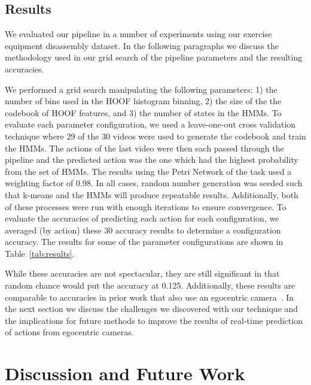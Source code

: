 \documentclass[10pt,twocolumn,letterpaper]{article}
\begin{document}
\subsection{Results}

We evaluated our pipeline in a number of experiments using our exercise equipment disassembly dataset. In the following paragraphs we discuss the methodology used in our grid search of the pipeline parameters and the resulting accuracies.

We performed a grid search manipulating the following parameters: 1) the number of bins used in the HOOF histogram binning, 2) the size of the the codebook of HOOF features, and 3) the number of states in the HMMs. To evaluate each parameter configuration, we used a leave-one-out cross validation technique where 29 of the 30 videos were used to generate the codebook and train the HMMs. The actions of the last video were then each passed through the pipeline and the predicted action was the one which had the highest probability from the set of HMMs. The results using the Petri Network of the task used a weighting factor of 0.98. In all cases, random number generation was seeded such that k-means and the HMMs will produce repeatable results. Additionally, both of these processes were run with enough iterations to ensure convergence. To evaluate the accuracies of predicting each action for each configuration, we averaged (by action) these 30 accuracy results to determine a configuration accuracy. The results for some of the parameter configurations are shown in Table~\ref{tab:results}.
 

While these accuracies are not spectacular, they are still significant in that random chance would put the accuracy at 0.125. Additionally, these results are comparable to accuracies in prior work that also use an egocentric camera~\cite{TODO-RONAK}. In the next section we discuss the challenges we discovered with our technique and the implications for future methods to improve the results of real-time prediction of actions from egocentric cameras.

\section{Discussion and Future Work}
\end{document}
